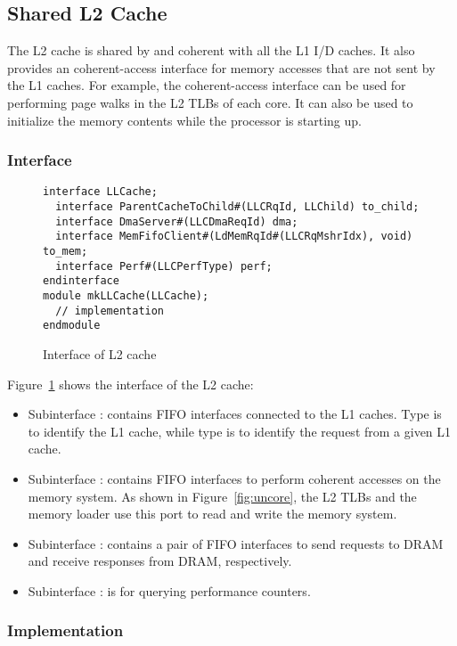 \subsection{Shared L2 Cache}
The L2 cache is shared by and coherent with all the L1 I/D caches.
It also provides an coherent-access interface for memory accesses that are not sent by the L1 caches.
For example, the coherent-access interface can be used for performing page walks in the L2 TLBs of each core.
It can also be used to initialize the memory contents while the processor is starting up.

\subsubsection{Interface}

\begin{figure}
\begin{lstlisting}[caption={}]
interface LLCache;
  interface ParentCacheToChild#(LLCRqId, LLChild) to_child;
  interface DmaServer#(LLCDmaReqId) dma;
  interface MemFifoClient#(LdMemRqId#(LLCRqMshrIdx), void) to_mem;
  interface Perf#(LLCPerfType) perf;
endinterface
module mkLLCache(LLCache);
  // implementation
endmodule
\end{lstlisting}
\caption{Interface of L2 cache}\label{fig:l2-cache-ifc}
\end{figure}

Figure~\ref{fig:l2-cache-ifc} shows the interface of the L2 cache:
\begin{itemize}
    \item Subinterface : contains FIFO interfaces connected to the L1 caches.
    Type  is to identify the L1 cache, while type  is to identify the request from a given L1 cache.
    \item Subinterface : contains FIFO interfaces to perform coherent accesses on the memory system.
    As shown in Figure~\ref{fig:uncore}, the L2 TLBs and the memory loader use this port to read and write the memory system.
    \item Subinterface : contains a pair of FIFO interfaces to send requests to DRAM and receive responses from DRAM, respectively.
    \item Subinterface : is for querying performance counters. 
\end{itemize}

\subsubsection{Implementation}